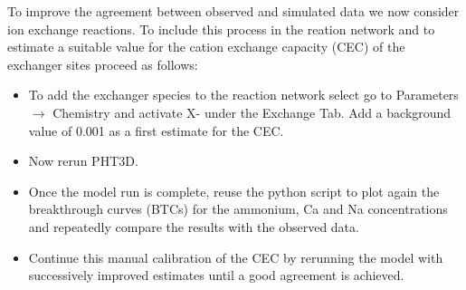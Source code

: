To improve the agreement between observed and simulated data we now consider ion exchange reactions. 
To include this process in the reation network and to estimate
a suitable value for the cation exchange capacity (CEC) of the exchanger sites 
proceed as follows: 

\begin{itemize}

\item To add the exchanger species to the reaction network
select go to {\color{blue}Parameters} $\rightarrow$ {\color{blue}Chemistry} 
and activate {\color{blue} X-} under the {\color{blue} Exchange Tab}.
Add a background value of 0.001 as a first estimate for the CEC. 

\item Now rerun PHT3D.

\item Once the model run is complete, reuse the python script to plot again the breakthrough 
curves (BTCs) for the ammonium, Ca and Na concentrations and repeatedly compare the results 
with the observed data.

\item Continue this manual calibration of the CEC by rerunning the model with successively improved
estimates until a good agreement is achieved.  

\end{itemize}


